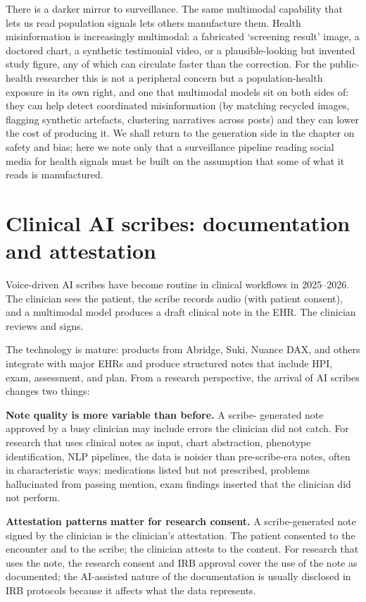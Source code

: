 \documentclass[
  letterpaper,
  11pt]{scrbook}
\begin{document}
There is a darker mirror to surveillance. The same multimodal capability
that lets us read population signals lets others manufacture them.
Health misinformation is increasingly multimodal: a fabricated
`screening result' image, a doctored chart, a synthetic testimonial
video, or a plausible-looking but invented study figure, any of which
can circulate faster than the correction. For the public-health
researcher this is not a peripheral concern but a population-health
exposure in its own right, and one that multimodal models sit on both
sides of: they can help detect coordinated misinformation (by matching
recycled images, flagging synthetic artefacts, clustering narratives
across posts) and they can lower the cost of producing it. We shall
return to the generation side in the chapter on safety and bias; here we
note only that a surveillance pipeline reading social media for health
signals must be built on the assumption that some of what it reads is
manufactured.

\section{Clinical AI scribes: documentation and
attestation}\label{clinical-ai-scribes-documentation-and-attestation}

Voice-driven AI scribes have become routine in clinical workflows in
2025--2026. The clinician sees the patient, the scribe records audio
(with patient consent), and a multimodal model produces a draft clinical
note in the EHR. The clinician reviews and signs.

The technology is mature: products from Abridge, Suki, Nuance DAX, and
others integrate with major EHRs and produce structured notes that
include HPI, exam, assessment, and plan. From a research perspective,
the arrival of AI scribes changes two things:

\textbf{Note quality is more variable than before.} A scribe- generated
note approved by a busy clinician may include errors the clinician did
not catch. For research that uses clinical notes as input, chart
abstraction, phenotype identification, NLP pipelines, the data is
noisier than pre-scribe-era notes, often in characteristic ways:
medications listed but not prescribed, problems hallucinated from
passing mention, exam findings inserted that the clinician did not
perform.

\textbf{Attestation patterns matter for research consent.} A
scribe-generated note signed by the clinician is the clinician's
attestation. The patient consented to the encounter and to the scribe;
the clinician attests to the content. For research that uses the note,
the research consent and IRB approval cover the use of the note as
documented; the AI-assisted nature of the documentation is usually
disclosed in IRB protocols because it affects what the data represents.
\end{document}
